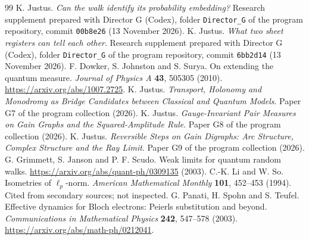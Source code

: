 \documentclass[11pt,a4paper]{article}
\begin{document}
\begin{thebibliography}{99}
 K. Justus. \emph{Can the walk identify its probability embedding?} Research supplement prepared with Director G (Codex), folder \texttt{Director\_G} of the program repository, commit \texttt{00b8e26} (13 November 2026).
 K. Justus. \emph{What two sheet registers can tell each other}. Research supplement prepared with Director G (Codex), folder \texttt{Director\_G} of the program repository, commit \texttt{6bb2d14} (13 November 2026).
 F. Dowker, S. Johnston and S. Surya. On extending the quantum measure. \emph{Journal of Physics A} \textbf{43}, 505305 (2010). \url{https://arxiv.org/abs/1007.2725}.
 K. Justus. \emph{Transport, Holonomy and Monodromy as Bridge Candidates between Classical and Quantum Models}. Paper G7 of the program collection (2026).
 K. Justus. \emph{Gauge-Invariant Pair Measures on Gain Graphs and the Squared-Amplitude Rule}. Paper G8 of the program collection (2026).
 K. Justus. \emph{Reversible Steps on Gain Digraphs: Arc Structure, Complex Structure and the Ray Limit}. Paper G9 of the program collection (2026).
 G. Grimmett, S. Janson and P. F. Scudo. Weak limits for quantum random walks. \url{https://arxiv.org/abs/quant-ph/0309135} (2003).
 C.-K. Li and W. So. Isometries of $\ell_p$-norm. \emph{American Mathematical Monthly} \textbf{101}, 452--453 (1994). Cited from secondary sources; not inspected.
 G. Panati, H. Spohn and S. Teufel. Effective dynamics for Bloch electrons: Peierls substitution and beyond. \emph{Communications in Mathematical Physics} \textbf{242}, 547--578 (2003). \url{https://arxiv.org/abs/math-ph/0212041}.
\end{thebibliography}
\end{document}
